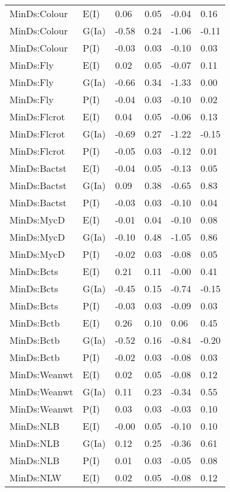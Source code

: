 \begin{center}
\begin{longtable}{|p{1.1in}|p{0.7in}|p{0.7in}|p{0.6in}|p{0.6in}|p{0.6in}|}
  MinDs:Colour & E(I) & 0.06 & 0.05 & -0.04 & 0.16 \\ 
  MinDs:Colour & G(Ia) & -0.58 & 0.24 & -1.06 & -0.11 \\ 
  MinDs:Colour & P(I) & -0.03 & 0.03 & -0.10 & 0.03 \\ 
  MinDs:Fly & E(I) & 0.02 & 0.05 & -0.07 & 0.11 \\ 
  MinDs:Fly & G(Ia) & -0.66 & 0.34 & -1.33 & 0.00 \\ 
  MinDs:Fly & P(I) & -0.04 & 0.03 & -0.10 & 0.02 \\ 
  MinDs:Flcrot & E(I) & 0.04 & 0.05 & -0.06 & 0.13 \\ 
  MinDs:Flcrot & G(Ia) & -0.69 & 0.27 & -1.22 & -0.15 \\ 
  MinDs:Flcrot & P(I) & -0.05 & 0.03 & -0.12 & 0.01 \\ 
  MinDs:Bactst & E(I) & -0.04 & 0.05 & -0.13 & 0.05 \\ 
  MinDs:Bactst & G(Ia) & 0.09 & 0.38 & -0.65 & 0.83 \\ 
  MinDs:Bactst & P(I) & -0.03 & 0.03 & -0.10 & 0.04 \\ 
  MinDs:MycD & E(I) & -0.01 & 0.04 & -0.10 & 0.08 \\ 
  MinDs:MycD & G(Ia) & -0.10 & 0.48 & -1.05 & 0.86 \\ 
  MinDs:MycD & P(I) & -0.02 & 0.03 & -0.08 & 0.05 \\ 
  MinDs:Bcts & E(I) & 0.21 & 0.11 & -0.00 & 0.41 \\ 
  MinDs:Bcts & G(Ia) & -0.45 & 0.15 & -0.74 & -0.15 \\ 
  MinDs:Bcts & P(I) & -0.03 & 0.03 & -0.09 & 0.03 \\ 
  MinDs:Bctb & E(I) & 0.26 & 0.10 & 0.06 & 0.45 \\ 
  MinDs:Bctb & G(Ia) & -0.52 & 0.16 & -0.84 & -0.20 \\ 
  MinDs:Bctb & P(I) & -0.02 & 0.03 & -0.08 & 0.03 \\ 
  MinDs:Weanwt & E(I) & 0.02 & 0.05 & -0.08 & 0.12 \\ 
  MinDs:Weanwt & G(Ia) & 0.11 & 0.23 & -0.34 & 0.55 \\ 
  MinDs:Weanwt & P(I) & 0.03 & 0.03 & -0.03 & 0.10 \\ 
  MinDs:NLB & E(I) & -0.00 & 0.05 & -0.10 & 0.10 \\ 
  MinDs:NLB & G(Ia) & 0.12 & 0.25 & -0.36 & 0.61 \\ 
  MinDs:NLB & P(I) & 0.01 & 0.03 & -0.05 & 0.08 \\ 
  MinDs:NLW & E(I) & 0.02 & 0.05 & -0.08 & 0.12 \\ 

\end{longtable}
\end{center}
